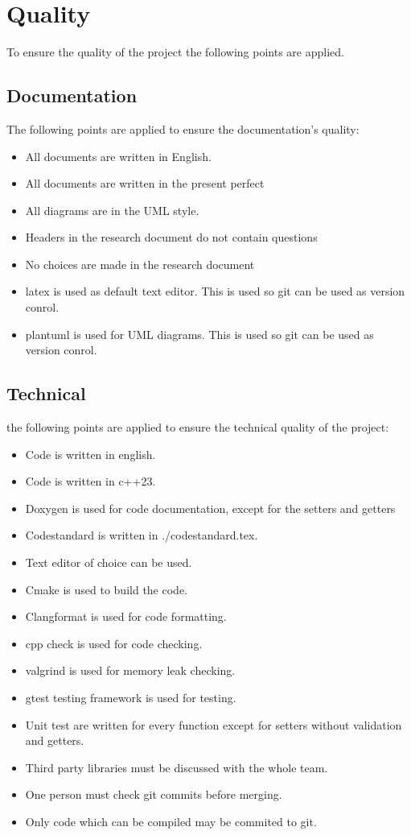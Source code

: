 \documentclass{article} %
\begin{document}
    \newpage

\section{Quality}
To ensure the quality of the project the following points are applied.
\subsection{Documentation}
The following points are applied to ensure the documentation’s quality:
\begin{itemize}
    \item All documents are written in English.
    \item All documents are written in the present perfect
    \item All diagrams are in the UML style.
    \item Headers in the research document do not contain questions
    \item No choices are made in the research document
    \item latex is used as default text editor. This is used so git can be used as version conrol.
    \item plantuml is used for UML diagrams. This is used so git can be used as version conrol.
\end{itemize}
\subsection{Technical}
the following points are applied to ensure the technical quality of the project:
\begin{itemize}
    \item Code is written in english.
    \item Code is written in c++23.
    \item Doxygen is used for code documentation, except for the setters and getters
    \item Codestandard is written in ./codestandard.tex.
    \item Text editor of choice can be used.
    \item Cmake is used to build the code.
    \item Clangformat is used for code formatting.
    \item cpp check is used for code checking.
    \item valgrind is used for memory leak checking.
    \item gtest testing framework is used for testing.
    \item Unit test are written for every function except for setters without validation and getters.
    \item Third party libraries must be discussed with the whole team.
    \item One person must check git commits before merging.
    \item Only code which can be compiled may be commited to git.
\end{itemize}
\end{document}
